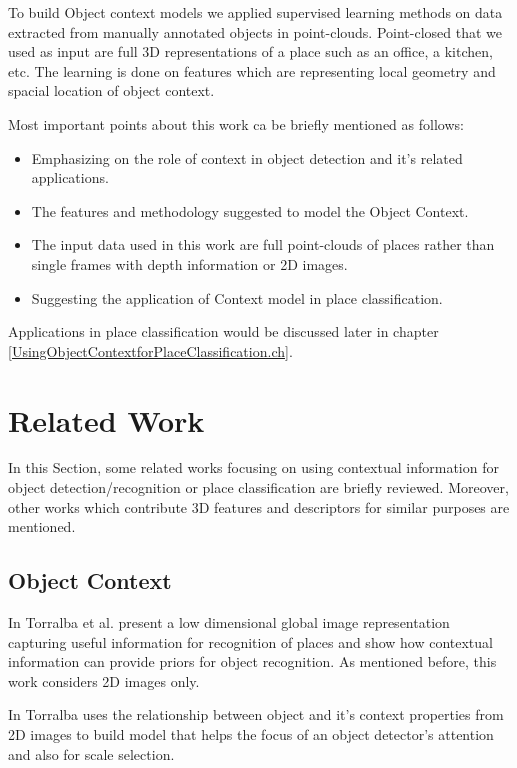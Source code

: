  To build Object context models we applied supervised learning methods on data extracted from manually annotated objects in 
 point-clouds. Point-closed that we used as input are full 3D representations of a place such as an office, a kitchen, etc. 
 The learning  is done on features which are representing local geometry and spacial location of object context.
 
 Most important points about this work ca be briefly mentioned as follows:
 
 \begin{itemize}
  \item Emphasizing on the role of context in object detection and it's related applications.
  \item The features and methodology suggested to model the Object Context.
  \item The input data used in this work are full point-clouds of places rather than single frames with depth information or 
  2D images.
  \item Suggesting the application of Context model in place classification.
  
 \end{itemize}

 
Applications in place classification would be discussed later in chapter \ref{UsingObjectContextforPlaceClassification.ch}.

\section {Related Work}
\label{RelatedWork.sec}
     In this Section, some related works focusing on using contextual information for object detection/recognition 
     or place classification are briefly reviewed. 
     Moreover, other works which contribute 3D features and descriptors for similar purposes are mentioned.
     
\subsection*{Object Context}
     In \cite{TrollbaContexBased} Torralba et al. present a low dimensional global image representation
     capturing useful information for recognition of places and show how contextual information can provide priors for object
     recognition. 
     As mentioned before, this work considers 2D images only. 
     
     In \cite{TorralbaContextualPriming} Torralba uses the relationship between object and it's context properties from 
     2D images to build model that helps the focus of an object detector's attention and also for scale selection. 
      
